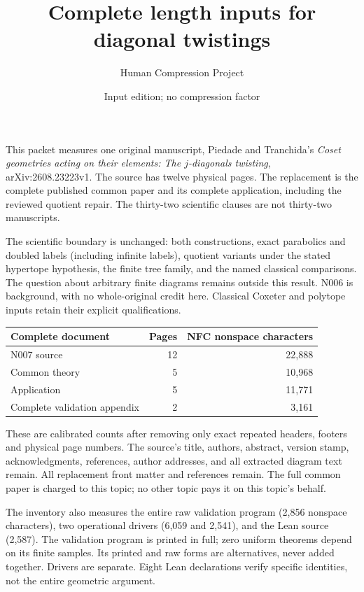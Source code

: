 \documentclass[11pt,a4paper]{article}
\title{Complete length inputs for diagonal twistings}\author{Human Compression Project}\date{Input edition; no compression factor}
\begin{document}
\maketitle
This packet measures one original manuscript, Piedade and Tranchida's \emph{Coset geometries acting on their elements: The $j$-diagonals twisting}, arXiv:2608.23223v1. The source has twelve physical pages. The replacement is the complete published common paper and its complete application, including the reviewed quotient repair. The thirty-two scientific clauses are not thirty-two manuscripts.

The scientific boundary is unchanged: both constructions, exact parabolics and doubled labels (including infinite labels), quotient variants under the stated hypertope hypothesis, the finite tree family, and the named classical comparisons. The question about arbitrary finite diagrams remains outside this result. N006 is background, with no whole-original credit here. Classical Coxeter and polytope inputs retain their explicit qualifications.

\begin{center}\begin{tabular}{lrr}\toprule
Complete document & Pages & NFC nonspace characters\\\midrule
N007 source & 12 & 22,888\\
Common theory & 5 & 10,968\\
Application & 5 & 11,771\\
Complete validation appendix & 2 & 3,161\\\bottomrule
\end{tabular}\end{center}
These are calibrated counts after removing only exact repeated headers, footers and physical page numbers. The source's title, authors, abstract, version stamp, acknowledgments, references, author addresses, and all extracted diagram text remain. All replacement front matter and references remain. The full common paper is charged to this topic; no other topic pays it on this topic's behalf.

The inventory also measures the entire raw validation program (2,856 nonspace characters), two operational drivers (6,059 and 2,541), and the Lean source (2,587). The validation program is printed in full; zero uniform theorems depend on its finite samples. Its printed and raw forms are alternatives, never added together. Drivers are separate. Eight Lean declarations verify specific identities, not the entire geometric argument.
\end{document}
